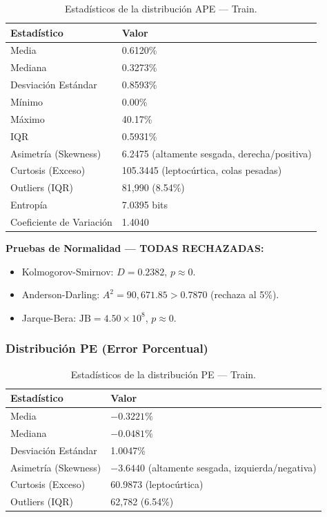 \documentclass{article}
\begin{document}
\begin{table}[htbp]
\centering
\caption{Estadísticos de la distribución APE — Train.}
\label{tab:train-ape}
\begin{tabular}{ll}
\hline
Estadístico & Valor \\
\hline
Media                    & 0.6120\% \\
Mediana                  & 0.3273\% \\
Desviación Estándar      & 0.8593\% \\
Mínimo                   & 0.00\% \\
Máximo                   & 40.17\% \\
IQR                      & 0.5931\% \\
Asimetría (Skewness)     & 6.2475 (altamente sesgada, derecha/positiva) \\
Curtosis (Exceso)        & 105.3445 (leptocúrtica, colas pesadas) \\
Outliers (IQR)           & 81,990 (8.54\%) \\
Entropía                 & 7.0395 bits \\
Coeficiente de Variación & 1.4040 \\
\hline
\end{tabular}
\end{table}

\textbf{Pruebas de Normalidad — TODAS RECHAZADAS:}
\begin{itemize}
\item Kolmogorov-Smirnov: $D = 0.2382$, $p \approx 0$.
\item Anderson-Darling: $A^2 = 90{,}671.85 > 0.7870$ (rechaza al 5\%).
\item Jarque-Bera: $\text{JB} = 4.50 \times 10^8$, $p \approx 0$.
\end{itemize}

\subsubsection{Distribución PE (Error Porcentual)}

\begin{table}[htbp]
\centering
\caption{Estadísticos de la distribución PE — Train.}
\label{tab:train-pe}
\begin{tabular}{ll}
\hline
Estadístico & Valor \\
\hline
Media                    & $-0.3221\%$ \\
Mediana                  & $-0.0481\%$ \\
Desviación Estándar      & 1.0047\% \\
Asimetría (Skewness)     & $-3.6440$ (altamente sesgada, izquierda/negativa) \\
Curtosis (Exceso)        & 60.9873 (leptocúrtica) \\
Outliers (IQR)           & 62,782 (6.54\%) \\
\hline
\end{tabular}
\end{table}
\end{document}
